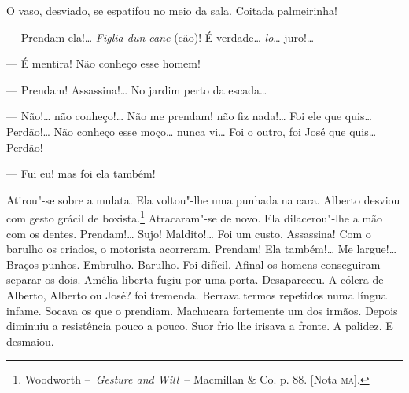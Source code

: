 \begin{linenumbers}
O vaso, desviado, se espatifou no meio da sala. Coitada palmeirinha!

--- Prendam ela!\ldots{} \emph{Figlia dun cane} (cão)! É verdade\ldots{}
\emph{lo}\ldots{} juro!\ldots{}

--- É mentira! Não conheço esse homem!

--- Prendam! Assassina!\ldots{} No jardim perto da escada\ldots{}

--- Não!\ldots{} não conheço!\ldots{} Não me prendam! não fiz nada!\ldots{} Foi ele que
quis\ldots{} Perdão!\ldots{} Não conheço esse moço\ldots{} nunca vi\ldots{} Foi o outro, foi
José que quis\ldots{} Perdão!

--- Fui eu! mas foi ela também!

Atirou"-se sobre a mulata. Ela voltou"-lhe uma punhada na cara. Alberto
desviou com gesto grácil de boxista.\footnote{Woodworth --~\emph{Gesture
  and Will}~-- Macmillan \& Co. p. 88. {[}Nota \textsc{ma}{]}.} Atracaram"-se de
novo. Ela dilacerou"-lhe a mão com os dentes. Prendam!\ldots{} Sujo!
Maldito!\ldots{} Foi um custo. Assassina! Com o barulho os criados, o
motorista acorreram. Prendam! Ela também!\ldots{} Me largue!\ldots{} Braços
punhos. Embrulho. Barulho. Foi difícil. Afinal os homens conseguiram
separar os dois. Amélia liberta fugiu por uma porta. Desapareceu. A
cólera de Alberto, Alberto ou José? foi tremenda. Berrava termos
repetidos numa língua infame. Socava os que o prendiam. Machucara
fortemente um dos irmãos. Depois diminuiu a resistência pouco a pouco.
Suor frio lhe irisava a fronte. A palidez. E desmaiou.


\end{linenumbers}

